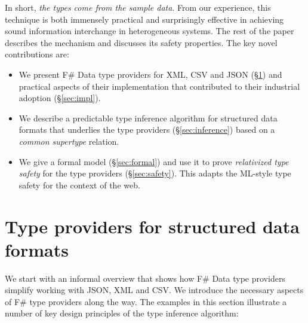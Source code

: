 \documentclass[10pt,preprint,blind,clearpagebib]{sigplanconf}
\begin{document}
In short, \emph{the types come from the sample data}.  From our experience, 
this technique is both immensely practical and surprisingly effective in achieving sound 
information interchange in heterogeneous systems.
The rest of the paper describes the mechanism and discusses its safety properties. 
The key novel contributions are:

\begin{itemize}
\item We present F\# Data type providers for XML, CSV and JSON (\S\ref{sec:providers}) 
  and practical aspects of their implementation that contributed to their industrial 
  adoption (\S\ref{sec:impl}). 

\item We describe a predictable type inference algorithm for structured data formats that
  underlies the type providers (\S\ref{sec:inference}) based on a \emph{common supertype}
  relation.

\item We give a formal model (\S\ref{sec:formal}) and use it to prove
  \emph{relativized type safety} for the type providers (\S\ref{sec:safety}).
  This adapts the ML-style type safety for the context of the web.
\end{itemize}



%
%

\section{Type providers for structured data formats}
\label{sec:providers}

We start with an informal overview that shows how F\# Data type providers simplify working with 
JSON, XML and CSV. We introduce the necessary aspects of F\# type providers along the 
way. The examples in this section illustrate a number of key design principles of the type inference 
algorithm:
\end{document}

